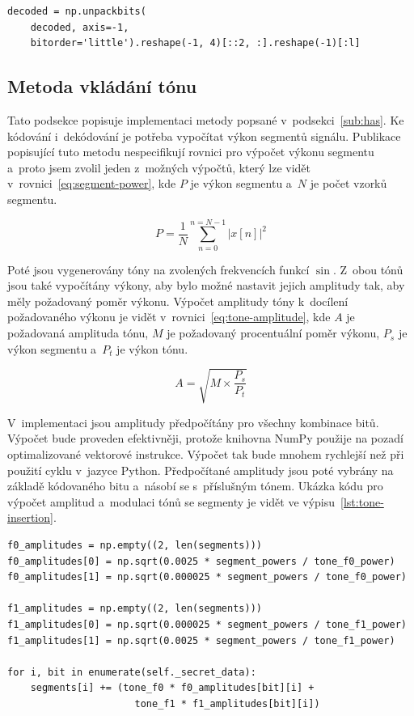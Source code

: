 \begin{lstlisting}[language=PythonPlus, label={lst:get-4-bits-from-byte},
caption={Extrakce pouze 4~bitů z~každého bajtu.}]
decoded = np.unpackbits(
    decoded, axis=-1,
    bitorder='little').reshape(-1, 4)[::2, :].reshape(-1)[:l]
\end{lstlisting}

\subsection*{Metoda vkládání tónu}
\label{sub:tone-insertion-implementation}

Tato podsekce popisuje implementaci metody popsané v~podsekci~\ref{sub:has}. Ke
kódování i~dekódování je potřeba vypočítat výkon segmentů signálu. Publikace
popisující tuto metodu nespecifikují rovnici pro výpočet výkonu segmentu
a~proto jsem zvolil jeden z~možných výpočtů, který lze vidět
v~rovnici~\ref{eq:segment-power}, kde $P$ je výkon segmentu a~$N$ je počet
vzorků segmentu.

\begin{equation}
    \label{eq:segment-power}
    P = \frac{1}{N} \sum_{n=0}^{n=N-1}{|x[n]|^2}
\end{equation}

\noindent Poté jsou vygenerovány tóny na zvolených frekvencích funkcí $\sin$. Z~obou tónů
jsou také vypočítány výkony, aby bylo možné nastavit jejich amplitudy tak, aby
měly požadovaný poměr výkonu. Výpočet amplitudy tóny k~docílení požadovaného
výkonu je vidět v~rovnici~\ref{eq:tone-amplitude}, kde $A$ je požadovaná
amplituda tónu, $M$ je požadovaný procentuální poměr výkonu, $P_s$ je výkon
segmentu a~$P_t$ je výkon tónu.

\begin{equation}
    \label{eq:tone-amplitude}
    A = \sqrt{M \times \frac{P_s}{P_t}}
\end{equation}

\noindent V~implementaci jsou amplitudy předpočítány pro všechny kombinace
bitů. Výpočet bude proveden efektivněji, protože knihovna NumPy použije na
pozadí optimalizované vektorové instrukce. Výpočet tak bude mnohem rychlejší
než při použití cyklu v~jazyce Python. Předpočítané amplitudy jsou poté vybrány
na základě kódovaného bitu a~násobí se s~příslušným tónem. Ukázka kódu pro
výpočet amplitud a~modulaci tónů se segmenty je vidět ve
výpisu~\ref{lst:tone-insertion}.

\begin{lstlisting}[language=PythonPlus, label={lst:tone-insertion},
caption={Výpočet amplitud a~přidání tónů k~segmentům.}]
f0_amplitudes = np.empty((2, len(segments)))
f0_amplitudes[0] = np.sqrt(0.0025 * segment_powers / tone_f0_power)
f0_amplitudes[1] = np.sqrt(0.000025 * segment_powers / tone_f0_power)

f1_amplitudes = np.empty((2, len(segments)))
f1_amplitudes[0] = np.sqrt(0.000025 * segment_powers / tone_f1_power)
f1_amplitudes[1] = np.sqrt(0.0025 * segment_powers / tone_f1_power)

for i, bit in enumerate(self._secret_data):
    segments[i] += (tone_f0 * f0_amplitudes[bit][i] +
                      tone_f1 * f1_amplitudes[bit][i])
\end{lstlisting}


